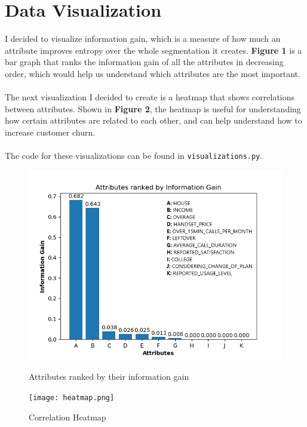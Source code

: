\documentclass[12pt, notitlepage]{article}
\begin{document}
\section{Data Visualization}
I decided to visualize information gain, which is a measure of how much an attribute improves entropy over the whole segmentation it creates. \textbf{Figure 1} is a bar graph that ranks the information gain of all the attributes in decreasing order, which would help us understand which attributes are the most important.\\\\
The next visualization I decided to create is a heatmap that shows correlations between attributes. Shown in \textbf{Figure 2}, the heatmap is useful for understanding how certain attributes are related to each other, and can help understand how to increase customer churn.\\\\
The code for these visualizations can be found in \texttt{visualizations.py}. 
\begin{figure}[H]
	\centering
	\includegraphics[scale=0.8]{InformationGain.png}
	\caption{Attributes ranked by their information gain}
	\centering 
	\texttt{[image: heatmap.png]}
	\caption{Correlation Heatmap}
\end{figure}
\end{document}

